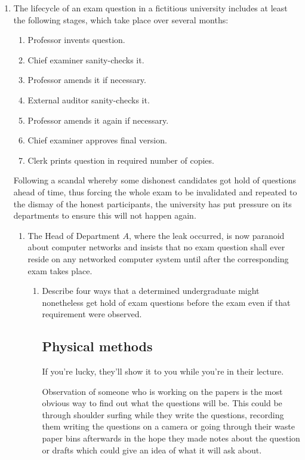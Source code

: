 \documentclass[10pt,\jkfside,a4paper]{article}
\begin{document}
\begin{enumerate}

\item The lifecycle of an exam question in a fictitious university includes at least the following 
stages, which take place over several months:

\begin{enumerate}[label=(\roman*)]
\item Professor invents question.
\item Chief examiner sanity-checks it.
\item Professor amends it if necessary.
\item External auditor sanity-checks it.
\item Professor amends it again if necessary.
\item Chief examiner approves final version.
\item Clerk prints question in required number of copies.
\end{enumerate}

Following a scandal whereby some dishonest candidates got hold of questions ahead of time, 
thus forcing the whole exam to be invalidated and repeated to the dismay of the honest 
participants, the university has put pressure on its departments to ensure this will not 
happen again.

\begin{enumerate}

\item The Head of Department $A$, where the leak occurred, is now paranoid about computer 
networks and insists that no exam question shall ever reside on any networked computer 
system until after the corresponding exam takes place.

\begin{enumerate}[label=(\roman*)]

\item Describe four ways that a determined undergraduate might nonetheless get hold of exam 
questions before the exam even if that requirement were observed.

\subsection*{Physical methods}

{\color{blue}
If you're lucky, they'll show it to you while you're in their lecture.
}

Observation of someone who is working on the papers is the most obvious way to find
out what the questions will be. This could be through shoulder surfing
while they write the questions, recording them writing the questions on a camera
or going through their waste paper bins afterwards in the hope they made notes about the
question or drafts which could give an idea of what it will ask about.


\end{enumerate}
\end{enumerate}
\end{enumerate}
\end{document}
